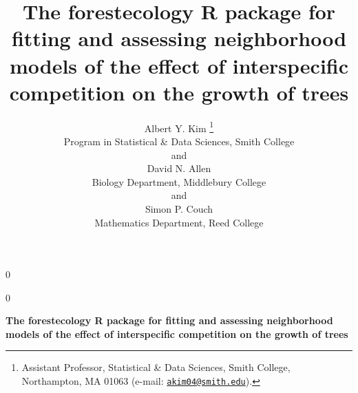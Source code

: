 \documentclass[12pt]{article}
\newcommand{\blind}{0}
\begin{document}
\def\spacingset#1{\renewcommand{\baselinestretch}%
{#1}\small\normalsize} \spacingset{1}



\blind
{
  \title{\bf The forestecology R package for fitting and assessing
neighborhood models of the effect of interspecific competition on the
growth of trees}

  \author{
        Albert Y. Kim \thanks{Assistant Professor, Statistical \& Data
Sciences, Smith College, Northampton, MA 01063 (e-mail:
\href{mailto:akim04@smith.edu}{\nolinkurl{akim04@smith.edu}}).} \\
    Program in Statistical \& Data Sciences, Smith College\\
     and \\     David N. Allen \\
    Biology Department, Middlebury College\\
     and \\     Simon P. Couch \\
    Mathematics Department, Reed College\\
      }
  \maketitle
} \fi

\blind
{
  \bigskip
  \bigskip
  \bigskip
  \begin{center}
    {\LARGE\bf The forestecology R package for fitting and assessing
neighborhood models of the effect of interspecific competition on the
growth of trees}
  \end{center}
  \medskip
} \fi
\end{document}
